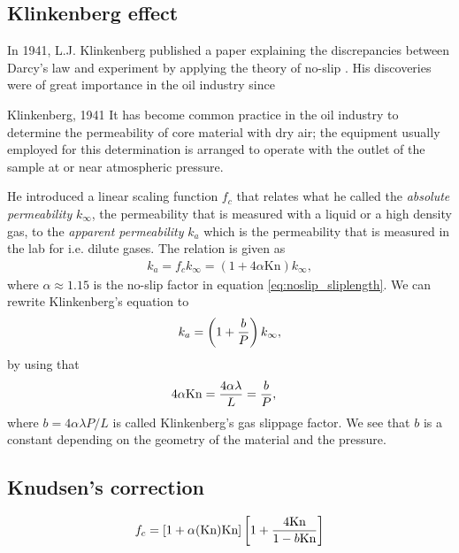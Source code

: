 \subsection{Klinkenberg effect}
In 1941, L.J. Klinkenberg published a paper explaining the discrepancies between Darcy's law and experiment by applying the theory of no-slip \cite{klinkenberg1941permeability}. His discoveries were of great importance in the oil industry since
\begin{aquote}{Klinkenberg, 1941}
	It has become common practice in the oil industry to determine the permeability of core material with dry air; the equipment usually employed for this determination is arranged to operate with the outlet of the sample at or near atmospheric pressure.
\end{aquote}
He introduced a linear scaling function $f_c$ that relates what he called the \textit{absolute permeability} $k_\infty$, the permeability that is measured with a liquid or a high density gas, to the \textit{apparent permeability} $k_a$ which is the permeability that is measured in the lab for i.e. dilute gases. The relation is given as
\begin{align}
	k_a = f_c k_\infty = \left(1 + 4\alpha\text{Kn}\right)k_\infty,
\end{align}
where $\alpha\approx 1.15$ is the no-slip factor in equation \eqref{eq:noslip_sliplength}. We can rewrite Klinkenberg's equation to 
\begin{align}
	k_a = \left(1 + {b\over P}\right)k_\infty,
\end{align}
by using that
\begin{align}
	4\alpha\text{Kn} &= {4\alpha\lambda \over L} = {b\over P},
\end{align}
where $b=4\alpha\lambda P / L$ is called Klinkenberg's gas slippage factor. We see that $b$ is a constant depending on the geometry of the material and the pressure. 
\subsection{Knudsen's correction}
\label{sec:knudsen_correction}
\begin{align}
	\label{eq:knudsen_correction}
	f_c = [1 + \alpha(\text{Kn})\text{Kn}]\left[1 + {4\text{Kn}\over 1 - b\text{Kn}}\right]
\end{align}
